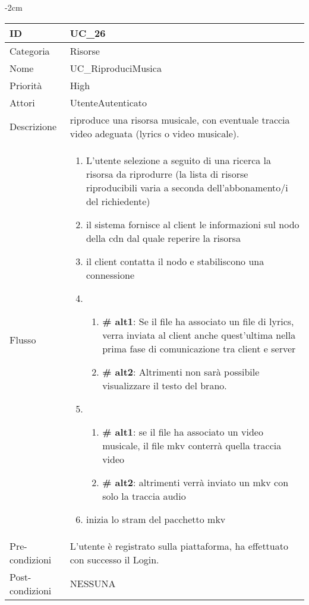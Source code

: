 \begin{center}
\begin{table}[bp]
    \centering
    \addtolength{\leftskip} {-2cm}
\begin{tabular}{ |p{2.6cm}|p{13cm}|  }
\hline
ID & UC\_26 \\\hline
Categoria & Risorse\\\hline
Nome & UC\_RiproduciMusica\\\hline
Priorità & High \\\hline
Attori &  UtenteAutenticato \\\hline
Descrizione & riproduce una risorsa musicale, con eventuale traccia video adeguata (lyrics o video musicale).\\\hline
Flusso &  	\begin{enumerate}
			\item L'utente selezione a seguito di una ricerca la risorsa da riprodurre (la lista di risorse riproducibili varia a seconda dell'abbonamento/i del richiedente)
			\item il sistema fornisce al client le informazioni sul nodo della cdn dal quale reperire la risorsa 
			\item il client contatta il nodo e stabiliscono una connessione
			\item \begin{enumerate}[label= ]
				\item \textbf{\# alt1}: Se il file ha associato un file di lyrics, verra inviata al client anche quest'ultima nella prima fase di comunicazione tra client e server
				\item \textbf{\# alt2}: Altrimenti non sarà possibile visualizzare il testo del brano.
			\end{enumerate}
			\item \begin{enumerate}[label= ]
				\item \textbf{\# alt1}: se il file ha associato un video musicale, il file mkv conterrà quella traccia video
				\item \textbf{\# alt2}: altrimenti verrà inviato un mkv con solo la traccia audio
			\end{enumerate}
			\item inizia lo stram del pacchetto mkv
			\end{enumerate}
			\\\hline
Pre-condizioni & L'utente è registrato sulla piattaforma, ha effettuato con successo il Login.\\\hline
Post-condizioni & NESSUNA\\\hline
\end{tabular}
\label{table_use_case:26}\newline
\end{table}


\end{center}
